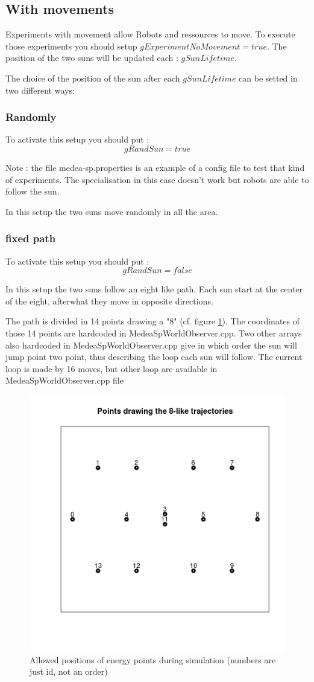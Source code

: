 \documentclass[a4paper,10pt]{report}
\begin{document}
\subsection{With movements}
Experiments with movement allow Robots and ressources to move. To execute those experiments you should setup $gExperimentNoMovement = true$.
The position of the two suns will be updated each : $gSunLifetime$. 

The choice of the position of the sun after each $gSunLifetime$ can be setted in two different ways:


\subsubsection{Randomly }
To activate this setup you should put :
$$ gRandSun = true$$

Note : the file medea-sp.properties is an example of a config file to test that kind of experiments. The specialisation in this case doesn't work but robots are able to follow the sun.

In this setup the two suns move randomly in all the area. 

\subsubsection{fixed path}
To activate this setup you should put :
$$ gRandSun = false$$

In this setup the two suns follow an eight like path. Each sun start at the center of the eight, afterwhat they move in opposite directions. 

The path is divided in 14 points drawing a "8" (cf. figure \ref{fig:8like}). The coordinates of those 14 points are hardcoded in MedeaSpWorldObserver.cpp. Two other arrays also hardcoded in MedeaSpWorldObserver.cpp give in which order the sun will jump point two point, thus describing the loop each sun will follow. The current loop is made by 16 moves, but other loop are available in MedeaSpWorldObserver.cpp file

\begin{figure}[H]
\caption{Allowed positions of energy points during simulation (numbers are just id, not an order)}
\label{fig:8like}
\centering
\includegraphics[width=.5\textwidth]{../images/traj8like}
 \end{figure}
\end{document}
